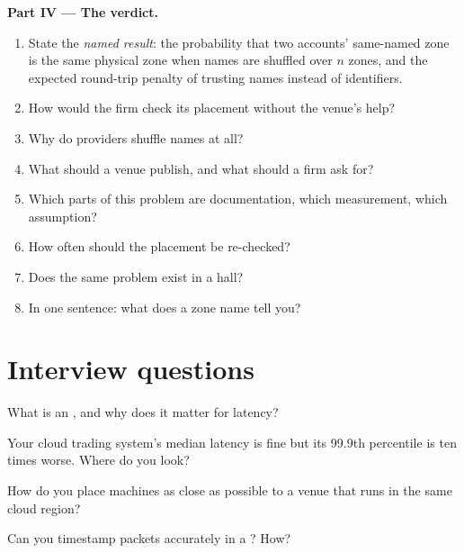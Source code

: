 \begin{problem}
\medskip\noindent\textbf{Part IV --- The verdict.}
\begin{enumerate}[resume]
\item State the \emph{named result}: the probability that two accounts' same-named zone is the same physical zone when names are shuffled over $n$
  zones, and the expected round-trip penalty of trusting names instead of identifiers.
\item How would the firm check its placement without the venue's help?
\item Why do providers shuffle names at all?
\item What should a venue publish, and what should a firm ask for?
\item Which parts of this problem are documentation, which measurement, which assumption?
\item How often should the placement be re-checked?
\item Does the same problem exist in a  hall?
\item In one sentence: what does a zone name tell you?
\end{enumerate}
\end{problem}

\section{Interview questions}

\begin{interviewq}\label{iq:nw:trading-in-a-public-cloud:1}
What is an , and why does it matter for latency?
\end{interviewq}

\begin{interviewq}\label{iq:nw:trading-in-a-public-cloud:2}
Your cloud trading system's median latency is fine but its 99.9th percentile is ten times worse. Where do you look?
\end{interviewq}

\begin{interviewq}\label{iq:nw:trading-in-a-public-cloud:3}
How do you place machines as close as possible to a venue that runs in the same cloud region?
\end{interviewq}

\begin{interviewq}\label{iq:nw:trading-in-a-public-cloud:4}
Can you timestamp packets accurately in a ? How?
\end{interviewq}

